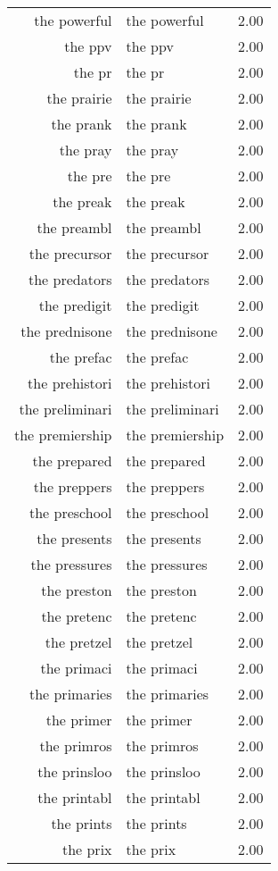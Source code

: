 \begin{table}[ht]
\begin{tabular}{rlr}
  the powerful & the powerful & 2.00 \\ 
  the ppv & the ppv & 2.00 \\ 
  the pr & the pr & 2.00 \\ 
  the prairie & the prairie & 2.00 \\ 
  the prank & the prank & 2.00 \\ 
  the pray & the pray & 2.00 \\ 
  the pre & the pre & 2.00 \\ 
  the preak & the preak & 2.00 \\ 
  the preambl & the preambl & 2.00 \\ 
  the precursor & the precursor & 2.00 \\ 
  the predators & the predators & 2.00 \\ 
  the predigit & the predigit & 2.00 \\ 
  the prednisone & the prednisone & 2.00 \\ 
  the prefac & the prefac & 2.00 \\ 
  the prehistori & the prehistori & 2.00 \\ 
  the preliminari & the preliminari & 2.00 \\ 
  the premiership & the premiership & 2.00 \\ 
  the prepared & the prepared & 2.00 \\ 
  the preppers & the preppers & 2.00 \\ 
  the preschool & the preschool & 2.00 \\ 
  the presents & the presents & 2.00 \\ 
  the pressures & the pressures & 2.00 \\ 
  the preston & the preston & 2.00 \\ 
  the pretenc & the pretenc & 2.00 \\ 
  the pretzel & the pretzel & 2.00 \\ 
  the primaci & the primaci & 2.00 \\ 
  the primaries & the primaries & 2.00 \\ 
  the primer & the primer & 2.00 \\ 
  the primros & the primros & 2.00 \\ 
  the prinsloo & the prinsloo & 2.00 \\ 
  the printabl & the printabl & 2.00 \\ 
  the prints & the prints & 2.00 \\ 
  the prix & the prix & 2.00 \\ 

\end{tabular}
\end{table}
